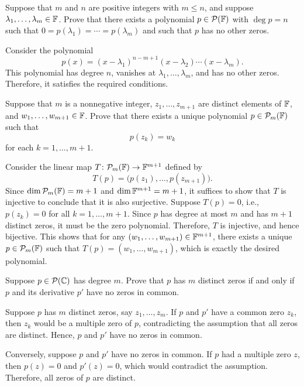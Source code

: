 \begin{exercise}
Suppose that $m$ and $n$ are positive integers with $m\le n$, and suppose
$\lambda_1,\dots,\lambda_m\in\mathbb{F}$. Prove that there exists a polynomial
$p\in\mathcal{P}(\mathbb{F})$ with $\deg p=n$ such that
$0=p(\lambda_1)=\cdots=p(\lambda_m)$ and such that $p$ has no other zeros.
\end{exercise}
\begin{solution}
Consider the polynomial
\[ p(x)=(x-\lambda_1)^{n-m+1}(x-\lambda_2)\cdots(x-\lambda_m). \]
This polynomial has degree $n$, vanishes at $\lambda_1,\dots,\lambda_m$, and
has no other zeros. Therefore, it satisfies the required conditions.
\end{solution}

\begin{exercise}
Suppose that $m$ is a nonnegative integer, $z_1,\dots,z_{m+1}$ are distinct
elements of $\mathbb{F}$, and $w_1,\dots,w_{m+1}\in\mathbb{F}$. Prove that there exists a
unique polynomial $p\in\mathcal{P}_m(\mathbb{F})$ such that
\[ p(z_k)=w_k \]
for each $k=1,\dots,m+1$.
\end{exercise}
\begin{solution}
Consider the linear map $T\colon\mathcal{P}_m(\mathbb{F})\to\mathbb{F}^{m+1}$ defined by
\[ T(p)=\bigl(p(z_1),\dots,p(z_{m+1})\bigr). \]
Since $\operatorname{dim}\mathcal{P}_m(\mathbb{F})=m+1$ and $\operatorname{dim}\mathbb{F}^{m+1}=m+1$, it suffices to show that
$T$ is injective to conclude that it is also surjective. Suppose $T(p)=0$,
i.e., $p(z_k)=0$ for all $k=1,\dots,m+1$. Since $p$ has degree at most $m$ and
has $m+1$ distinct zeros, it must be the zero polynomial. Therefore, $T$ is
injective, and hence bijective. This shows that for any
$(w_1,\dots,w_{m+1})\in\mathbb{F}^{m+1}$, there exists a unique $p\in\mathcal{P}_m(\mathbb{F})$ such
that $T(p)=(w_1,\dots,w_{m+1})$, which is exactly the desired polynomial.
\end{solution}

\begin{exercise}
Suppose $p\in\mathcal{P}(\mathbb{C})$ has degree $m$. Prove that $p$ has $m$ distinct zeros
if and only if $p$ and its derivative $p'$ have no zeros in common.
\end{exercise}
\begin{solution}
Suppose $p$ has $m$ distinct zeros, say $z_1,\dots,z_m$. If $p$ and $p'$ have
a common zero $z_k$, then $z_k$ would be a multiple zero of $p$, contradicting
the assumption that all zeros are distinct. Hence, $p$ and $p'$ have no zeros
in common.

Conversely, suppose $p$ and $p'$ have no zeros in common. If $p$ had a
multiple zero $z$, then $p(z)=0$ and $p'(z)=0$, which would contradict the
assumption. Therefore, all zeros of $p$ are distinct.
\end{solution}

